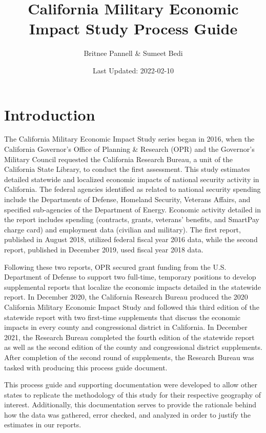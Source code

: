 \documentclass[
]{book}
\title{California Military Economic Impact Study Process Guide}
\author{Britnee Pannell \& Sumeet Bedi}
\date{Last Updated: 2022-02-10}
\begin{document}
\maketitle

{
\setcounter{tocdepth}{1}
\tableofcontents
}
\hypertarget{introduction}{%
\chapter{Introduction}\label{introduction}}

The California Military Economic Impact Study series began in 2016, when the California Governor's Office of Planning \& Research (OPR) and the Governor's Military Council requested the California Research Bureau, a unit of the California State Library, to conduct the first assessment. This study estimates detailed statewide and localized economic impacts of national security activity in California. The federal agencies identified as related to national security spending include the Departments of Defense, Homeland Security, Veterans Affairs, and specified sub-agencies of the Department of Energy. Economic activity detailed in the report includes spending (contracts, grants, veterans' benefits, and SmartPay charge card) and employment data (civilian and military). The first report, published in August 2018, utilized federal fiscal year 2016 data, while the second report, published in December 2019, used fiscal year 2018 data.

Following these two reports, OPR secured grant funding from the U.S. Department of Defense to support two full-time, temporary positions to develop supplemental reports that localize the economic impacts detailed in the statewide report. In December 2020, the California Research Bureau produced the 2020 California Military Economic Impact Study and followed this third edition of the statewide report with two first-time supplements that discuss the economic impacts in every county and congressional district in California. In December 2021, the Research Bureau completed the fourth edition of the statewide report as well as the second edition of the county and congressional district supplements. After completion of the second round of supplements, the Research Bureau was tasked with producing this process guide document.

This process guide and supporting documentation were developed to allow other states to replicate the methodology of this study for their respective geography of interest. Additionally, this documentation serves to provide the rationale behind how the data was gathered, error checked, and analyzed in order to justify the estimates in our reports.
\end{document}

